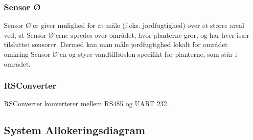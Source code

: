 \subsubsection{Sensor Ø}
Sensor Ø’er giver mulighed for at måle (f.eks. jordfugtighed) over et større areal ved, at Sensor Ø’erne spredes over området, hvor planterne gror, og har hver især tilsluttet sensorer. Dermed kan man måle jordfugtighed lokalt for området omkring Sensor Ø’en og styre vandtilførslen specifikt for planterne, som står i området.

\subsubsection{RSConverter}
RSConverter konverterer mellem RS485 og UART 232.

\subsection{System Allokeringsdiagram}







